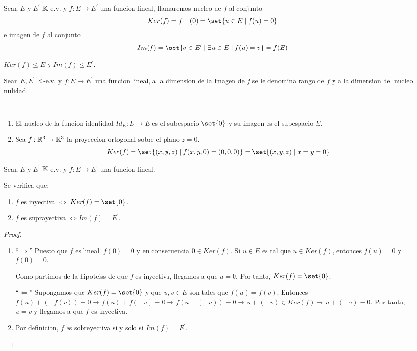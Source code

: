 \begin{definition}
	Sean \(E \) y \(E^\prime  \) \(\mathbb{K}\)-e.v. y \(f \colon E \to E^\prime \) una funcion lineal, llamaremos nucleo de \(f \) al conjunto
	\[
		Ker(f) = f^{-1} ({0}) = \set{u \in E \mid f(u) = 0 }
	\]
	e imagen de \(f \) al conjunto
	\[
		Im(f) = \set{v \in E^\prime \mid \exists u \in E \mid f(u) = v } = f(E)
	\]
\end{definition}
\begin{remark}
	\(Ker(f) \leq E \) y \(Im(f) \leq E^\prime \).
\end{remark}

\begin{definition}
	Sean \(E, E^\prime  \) \(\mathbb{K} \)-e.v. y \(f \colon E \to E^\prime \) una funcion lineal, a la dimension de la imagen de \(f \) se le denomina rango de \(f \) y a la dimension del nucleo nulidad.
\end{definition}
\begin{example}
	~\begin{enumerate}
		\item El nucleo de la funcion identidad \(Id_E \colon E \to E \) es el subespacio \(\set{0}\) y su imagen es el subespacio \(E \).
		\item Sea \(f: \mathbb{R}^{3} \to \mathbb{R}^{3 } \) la proyeccion ortogonal sobre el plano \(z = 0 \).
		      \[
			      Ker(f) = \set{(x,y,z) \mid f(x,y,0) = (0,0,0)} = \set{(x,y,z) \mid x = y = 0}
		      \]
	\end{enumerate}
\end{example}

\begin{theorem}
	Sean \(E \) y \(E^\prime  \) \(\mathbb{K}\)-e.v. y \(f \colon E \to E^\prime  \) una funcion lineal.

	Se verifica que:
	\begin{enumerate}
		\item \(f \) es inyectiva \(\iff  \) \(Ker(f) = \set{0 }\).
		\item \(f \) es suprayectiva \(\iff Im(f) = E^\prime \).
	\end{enumerate}
\end{theorem}
\begin{proof}
	\begin{enumerate}
		\item ``\(\Rightarrow \)'' Puesto que \(f \) es lineal, \(f(0) = 0 \) y en consecuencia \(0 \in Ker(f )\). Si \(u \in E \) es tal que \(u \in Ker(f )\), entonces \(f(u) = 0 \) y \(f(0) = 0 \).

		      Como partimos de la hipoteiss de que \(f \) es inyectiva, llegamos a que \(u = 0 \). Por tanto, \(Ker(f) = \set{0}\).

		      ``\(\Leftarrow \)'' Supongamos que \(Ker(f) = \set{0 }\) y que \(u,v \in E \) son tales que \(f(u) = f(v )\). Entonces \(f(u) + (-f(v)) = 0 \Rightarrow f(u) + f(-v) = 0 \Rightarrow f(u + (- v)) = 0 \Rightarrow u +(- v) \in Ker(f ) \Rightarrow u + (- v) = 0\). Por tanto, \(u = v \) y llegamos a que \(f \) es inyectiva.
		\item Por definicion, \(f \) es sobreyectiva si y solo si \(Im(f) = E^\prime \).
	\end{enumerate}
\end{proof}

